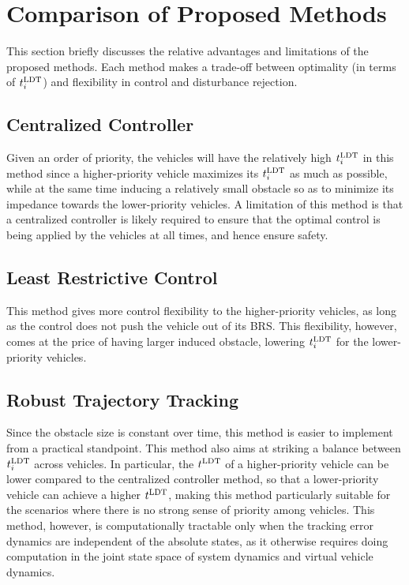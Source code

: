 \section{Comparison of Proposed Methods}
This section briefly discusses the relative advantages and limitations of the proposed methods. Each method makes a trade-off between optimality (in terms of $t^\text{LDT}_i$) and flexibility in control and disturbance rejection.

\subsection{Centralized Controller}
Given an order of priority, the vehicles will have the relatively high $t^\text{LDT}_i$ in this method since a higher-priority vehicle maximizes its $t^\text{LDT}_i$ as much as possible, while at the same time inducing a relatively small obstacle so as to minimize its impedance towards the lower-priority vehicles. A limitation of this method is that a centralized controller is likely required to ensure that the optimal control is being applied by the vehicles at all times, and hence ensure safety.

\subsection{Least Restrictive Control}
This method gives more control flexibility to the higher-priority vehicles, as long as the control does not push the vehicle out of its BRS. This flexibility, however, comes at the price of having larger induced obstacle, lowering $t^\text{LDT}_i$ for the lower-priority vehicles.  

\subsection{Robust Trajectory Tracking}
Since the obstacle size is constant over time, this method is easier to implement from a practical standpoint. This method also aims at striking a balance between $t^\text{LDT}_i$ across vehicles. In particular, the $t^\text{LDT}$ of a higher-priority vehicle can be lower compared to the centralized controller method, so that a lower-priority vehicle can achieve a higher $t^\text{LDT}$, making this method particularly suitable for the scenarios where there is no strong sense of priority among vehicles. This method, however, is computationally tractable only when the tracking error dynamics are independent of the absolute states, as it otherwise requires doing computation in the joint state space of system dynamics and virtual vehicle dynamics. 